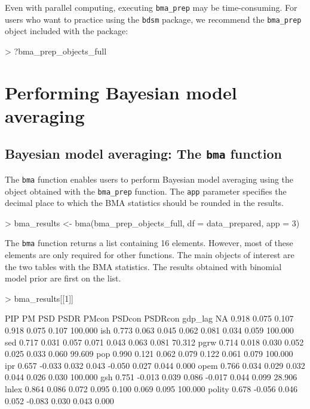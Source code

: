 \documentclass[a4paper]{article}
\begin{document}
Even with parallel computing, executing \verb+bma_prep+ may be time-consuming.
For users who want to practice using the \verb+bdsm+ package,
we recommend the \verb+bma_prep+ object included with the package:

\begin{Schunk}
\begin{Sinput}
> ?bma_prep_objects_full
\end{Sinput}
\end{Schunk}

\section{Performing Bayesian model averaging}\label{using_bma}

\subsection{Bayesian model averaging: The \texttt{bma} function}

The \verb+bma+ function enables users to perform Bayesian model averaging using
the object obtained with the \verb+bma_prep+ function.
The \verb+app+ parameter specifies the decimal place to which the BMA statistics should be rounded in the results.

\begin{Schunk}
\begin{Sinput}
> bma_results <- bma(bma_prep_objects_full, df = data_prepared, app = 3)
\end{Sinput}
\end{Schunk}

The \verb+bma+ function returns a list containing 16 elements.
However, most of these elements are only required for other functions.
The main objects of interest are the two tables with the BMA statistics.
The results obtained with binomial model prior are first on the list.

\begin{Schunk}
\begin{Sinput}
> bma_results[[1]]
\end{Sinput}
\begin{Soutput}
          PIP     PM   PSD  PSDR  PMcon PSDcon PSDRcon    %
gdp_lag    NA  0.918 0.075 0.107  0.918  0.075   0.107 100.000
ish     0.773  0.063 0.045 0.062  0.081  0.034   0.059 100.000
sed     0.717  0.031 0.057 0.071  0.043  0.063   0.081  70.312
pgrw    0.714  0.018 0.030 0.052  0.025  0.033   0.060  99.609
pop     0.990  0.121 0.062 0.079  0.122  0.061   0.079 100.000
ipr     0.657 -0.033 0.032 0.043 -0.050  0.027   0.044   0.000
opem    0.766  0.034 0.029 0.032  0.044  0.026   0.030 100.000
gsh     0.751 -0.013 0.039 0.086 -0.017  0.044   0.099  28.906
lnlex   0.864  0.086 0.072 0.095  0.100  0.069   0.095 100.000
polity  0.678 -0.056 0.046 0.052 -0.083  0.030   0.043   0.000
\end{Soutput}
\end{Schunk}
\end{document}
